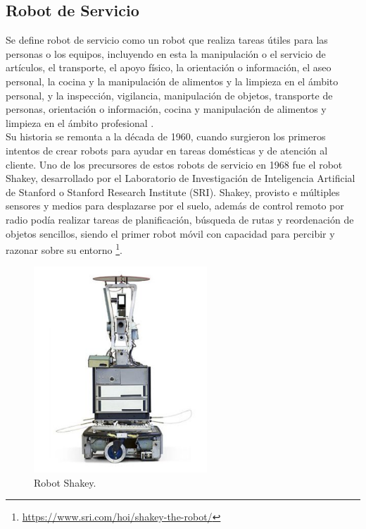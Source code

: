\pagebreak
   
\subsection{Robot de Servicio}
\label{sec:robot_servicio}

Se define robot de servicio como un robot que realiza tareas útiles para las personas o los equipos, incluyendo en esta la manipulación o el servicio de artículos, el transporte, el apoyo físico, la orientación o información, el aseo personal, la cocina y la manipulación de alimentos y la limpieza en el ámbito personal, y la inspección, vigilancia, manipulación de objetos, transporte de personas, orientación o información, cocina y manipulación de alimentos y limpieza en el ámbito profesional \cite{ISO8373}.\\

Su historia se remonta a la década de 1960, cuando surgieron los primeros intentos de crear robots para ayudar en tareas domésticas y de atención al cliente. Uno de los precursores de estos robots de servicio en 1968 fue el robot Shakey, desarrollado por el Laboratorio de Investigación de Inteligencia Artificial de Stanford o Stanford Research Institute (SRI). Shakey, provisto e múltiples sensores y medios para desplazarse por el suelo, además de control remoto por radio \cite{Sanchez07b} podía realizar tareas de planificación, búsqueda de rutas y reordenación de objetos sencillos, siendo el primer robot móvil con capacidad para percibir y razonar sobre su entorno \footnote{\url{https://www.sri.com/hoi/shakey-the-robot/}}. 

  \begin{figure} [h!]
    \begin{center}
      \includegraphics[width=65mm]{figs/Shakey.png}
    \end{center}
    \caption{Robot Shakey.}
    \label{fig:shakey}
  \end{figure}
  
